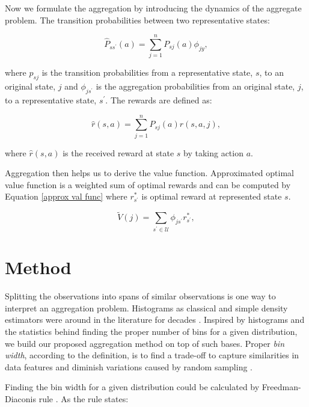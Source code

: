 \documentclass{article}
\begin{document}
    Now we formulate the aggregation by introducing the dynamics of the aggregate problem.
    The transition probabilities between two representative states:

    \begin{equation}
        \hat{P}_{s s^\prime}(a)=\sum_{j=1}^{n} P_{s j}(a) \phi_{j y},
    \end{equation}

    where $p_ {s j}$ is the transition probabilities from a representative state, $s$, to an original state, $j$
    and $\phi_{j s^\prime}$ is the aggregation probabilities from an original state, $j$, to a representative state,
    $s^\prime$.
    The rewards are defined as:

    \begin{equation}
        \hat{r}(s, a)=\sum_{j=1}^{n} P_{s j}(a) r(s, a, j),
    \end{equation}

    where $\hat{r}(s, a)$ is the received reward at state $s$ by taking action $a$.


    Aggregation then helps us to derive the value function.
    Approximated optimal value function is a weighted sum of optimal rewards and can be computed by
    Equation \ref{approx val func} where $r_{s^\prime}^{\ast}$ is optimal reward at represented state $s$.

    \begin{equation}
        \label{approx val func}
        \tilde{V}(j)=\sum_{s^\prime \in \mathcal{U}} \phi_{j s^\prime} r_{s^\prime}^{\ast},
    \end{equation}


\section{Method}
\label{sec:method}
    Splitting the observations into spans of similar observations is one way to interpret an aggregation
    problem.
    Histograms as classical and simple density estimators were around in the literature for decades \cite{Scott1979,
    Scott2015}.
    Inspired by histograms and the statistics behind finding the proper number of bins for a given distribution, we
    build our proposed aggregation method on top of such bases.
    Proper \textit{bin width}, according to the definition, is to find a trade-off to capture similarities in data
    features and diminish variations caused by random sampling \cite{Knuth2019}.

    Finding the bin width for a given distribution could be calculated by Freedman-Diaconis rule
    \cite{Freedman1981}.
    As the rule states:
\end{document}
